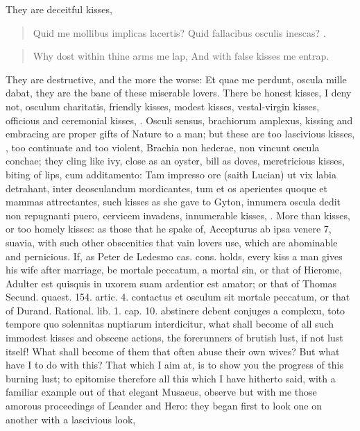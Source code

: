 They are deceitful kisses,

\begin{latin}
\begin{verse}
Quid me mollibus implicas lacertis?
Quid fallacibus osculis inescas? \etc{}.
\end{verse}
\end{latin}
\translationrule%
\begin{verse}%
Why dost within thine arms me lap,
And with false kisses me entrap.
\end{verse}%

They are destructive, and the more the worse: Et quae me perdunt,
oscula mille dabat, they are the bane of these miserable lovers. There
be honest kisses, I deny not, osculum charitatis, friendly kisses,
modest kisses, vestal-virgin kisses, officious and ceremonial kisses,
\etc{}. Osculi sensus, brachiorum amplexus, kissing and embracing are
proper gifts of Nature to a man; but these are too lascivious kisses,
, \etc{} too continuate
and too violent, Brachia non hederae, non vincunt oscula conchae;
they cling like ivy, close as an oyster, bill as doves, meretricious
kisses, biting of lips, cum additamento: Tam impresso ore (saith
Lucian) ut vix labia detrahant, inter deosculandum mordicantes,
tum et os aperientes quoque et mammas attrectantes, \etc{} such kisses as
she gave to Gyton, innumera oscula dedit non repugnanti puero, cervicem
invadens, innumerable kisses, \etc{}. More than kisses, or too homely
kisses: as those that he spake of, Accepturus ab ipsa venere 7,
suavia, \etc{} with such other obscenities that vain lovers use, which are
abominable and pernicious. If, as Peter de Ledesmo cas. cons. holds,
every kiss a man gives his wife after marriage, be mortale peccatum, a
mortal sin, or that of Hierome, Adulter est quisquis in uxorem
suam ardentior est amator; or that of Thomas Secund. quaest. 154.
artic. 4. contactus et osculum sit mortale peccatum, or that of Durand.
Rational. lib. 1. cap. 10. abstinere debent conjuges a complexu, toto
tempore quo solennitas nuptiarum interdicitur, what shall become of all
such immodest kisses and obscene actions, the forerunners of
brutish lust, if not lust itself! What shall become of them that often
abuse their own wives? But what have I to do with this?
That which I aim at, is to show you the progress of this burning lust;
to epitomise therefore all this which I have hitherto said, with a
familiar example out of that elegant Musaeus, observe but with me those
amorous proceedings of Leander and Hero: they began first to look one
on another with a lascivious look,

